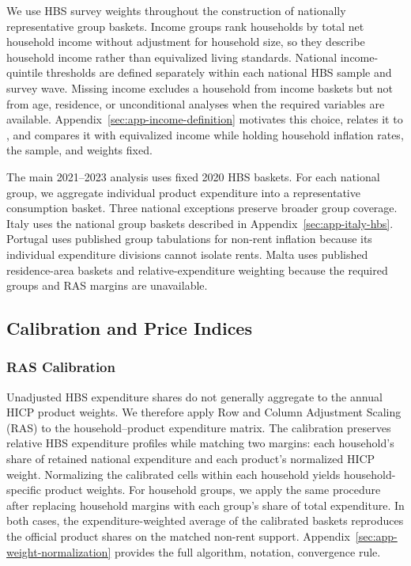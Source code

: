 \documentclass[11pt]{article}
\begin{document}
We use HBS survey weights throughout the construction of nationally representative group baskets.
Income groups rank households by total net household income without adjustment for household size,
so they describe household income rather than equivalized living standards. National
income-quintile thresholds are defined separately within each national HBS sample and survey wave. Missing income excludes a household from income
baskets but not from age, residence, or unconditional analyses when the required variables are
available. Appendix~\ref{sec:app-income-definition} motivates this choice, relates it to
\citet{klick2024equivalized}, and compares it with equivalized income while holding household
inflation rates, the sample, and weights fixed.

The main 2021--2023 analysis uses fixed 2020 HBS baskets. For each national group, we aggregate
individual product expenditure into a representative consumption basket. Three national exceptions
preserve broader group coverage. Italy uses the national group
baskets described in Appendix~\ref{sec:app-italy-hbs}. Portugal uses published group tabulations for
non-rent inflation because its individual expenditure divisions cannot isolate rents. Malta uses
published residence-area baskets and relative-expenditure weighting because the required groups and
RAS margins are unavailable.

\subsection{Calibration and Price Indices}
\label{sec:household-inflation-rates}

\subsubsection*{RAS Calibration}

Unadjusted HBS expenditure shares do not generally aggregate to the annual HICP product weights. We
therefore apply Row and Column Adjustment Scaling (RAS) to the household--product expenditure matrix.
The calibration preserves relative HBS expenditure profiles while matching two margins: each
household's share of retained national expenditure and each product's normalized HICP weight.
Normalizing the calibrated cells within each household yields household-specific product weights.
For household groups, we apply the same procedure after replacing household margins with each
group's share of total expenditure. In both cases, the expenditure-weighted average of the calibrated
baskets reproduces the official product shares on the matched non-rent support. Appendix~\ref{sec:app-weight-normalization}
provides the full algorithm, notation, convergence rule.
\end{document}
